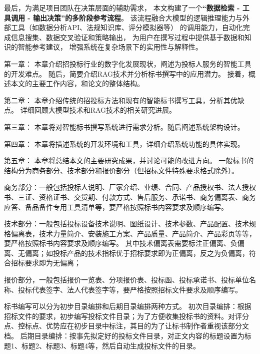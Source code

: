 \documentclass{xmu}
\begin{document}
最后，为满足项目团队在决策层面的辅助需求，
本文构建了一个{\bf “数据检索 - 工具调用 - 输出决策”的多阶段参考流程}。
该流程融合大模型的逻辑推理能力与外部工具（如数据分析API、法规知识库、评分模拟器等）
的调用能力，自动化完成信息搜集、数据交叉验证和策略输出，
为用户在撰写过程中提供基于数据和知识的智能参考建议，
增强系统在复杂场景下的实用性与解释性。

第一章：
本章介绍招投标行业的数字化发展现状，阐述为投标人服务的智能工具的开发难点。
随后，简要介绍RAG技术并分析标书撰写中的应用潜力。
接着，概述本文的主要工作内容，和论文的整体结构。

第二章：
本章介绍传统的招投标方法和现有的智能标书撰写工具，分析其优缺点。
详细回顾大模型技术和RAG技术的相关研究进展。

第三章：
本章将对智能标书撰写系统进行需求分析。随后阐述系统架构设计。

第四章：
本章将描述系统的开发环境和工具，详细介绍系统功能的具体实现。

第五章：
本章将总结本文的主要研究成果，并讨论可能的改进方向。
一般标书的结构分为商务部分、技术部分和报价部分（但招标文件特殊要求格式除外）。

商务部分：一般包括投标人说明、厂家介绍、业绩、合同、产品授权书、法人授权书、三证、资格证书、交货期、付款方式、售后服务、承诺书、商务偏离表、商务应答、备品备件专用工具清单等，要严格按照标书内容要求及顺序编写。

技术部分：一般包括投标设备技术说明、图纸设计、技术参数、产品配置、技术规格偏离表，技术力量简介、安装施工方案、产品质量、产品简介、产品彩页等等，要严格按照标书内容要求及顺序编写。
其中技术偏离表需要标注正偏离、负偏离、无偏离；如投标产品的技术指标优于招标要求即为正偏离，反之为负偏离，符合招标要求即为无偏离；

报价部分，一般包括报价一览表、分项报价表、投标函、投标承诺书、投标单位名称、投标代表签字、法人代表签字等，要严格按照招标文件要求及顺序编写。

标书编写可以分为初步目录编排和后期目录编排两种方式。
初次目录编排：根据招标文件的要求，初步编写投标文件目录；为了方便收集投标书的资料。对评分点、控标点、优势应在初步目录中标注，其目的为了让标书制作者重视该部分文档。
后期目录编排：按事先拟定好的投标文件目录，对正文内容的标题设置为标题1、标题2、标题3、标题4等，然后自动生成投标文件的目录。
\end{document}
